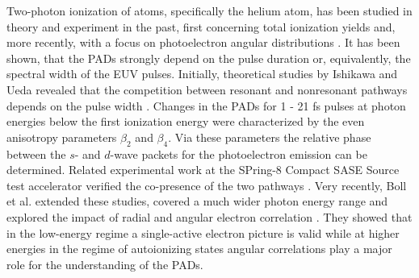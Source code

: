 Two-photon ionization of atoms, specifically the helium atom, has been studied in theory and experiment in the past, first concerning total ionization yields  \cite{nikolopoulos2001,vanderhart2005,shakeshaft2007,pi2010,florescu2011,sato2011,florescu2012} and, more recently, with a focus on photoelectron angular distributions \cite{ishikawa2012,ishikawa2013,ma2013,boll2019}. It has been shown, that the PADs strongly depend on the pulse duration or, equivalently, the spectral width of the EUV pulses. Initially, theoretical studies by Ishikawa and Ueda revealed that the competition between resonant and nonresonant pathways depends on the pulse width \cite{ishikawa2012,ishikawa2013}. Changes in the PADs for 1 - 21 fs pulses at photon energies below the first ionization energy were characterized by the even anisotropy parameters $\beta_2$ and $\beta_4$. Via these parameters the relative phase between the $s$- and $d$-wave packets for the photoelectron emission can be determined. Related experimental work at the SPring-8 Compact SASE Source test accelerator verified the co-presence of the two pathways \cite{ma2013}. Very recently, Boll et al. extended these studies, covered a much wider photon energy range and explored the impact of radial and angular electron correlation \cite{boll2019}. They showed that in the low-energy regime
a single-active electron picture is valid while at higher energies in the regime of autoionizing states angular correlations play a major role for the understanding of the PADs.

